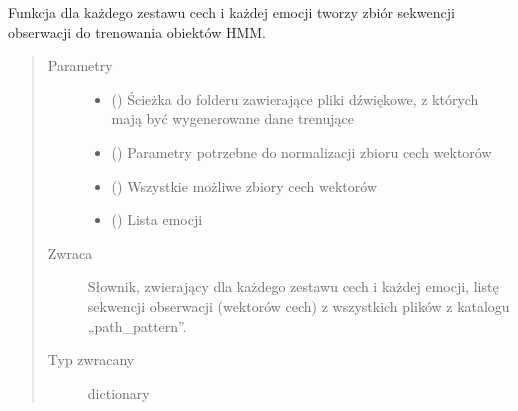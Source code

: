 \documentclass[letterpaper,10pt,polish]{sphinxmanual}
\begin{document}
\begin{fulllineitems}
\label{\detokenize{hmm_main:hmm_main.hmm_get_train_set}}
Funkcja dla każdego zestawu cech i każdej emocji tworzy zbiór sekwencji obserwacji do trenowania obiektów HMM.
\begin{quote}\begin{description}
\item[{Parametry}] \leavevmode\begin{itemize}
\item {} 
 () \textendash{} Ścieżka do folderu zawierające pliki dźwiękowe, z których mają być wygenerowane dane trenujące

\item {} 
 () \textendash{} Parametry potrzebne do normalizacji zbioru cech wektorów

\item {} 
 () \textendash{} Wszystkie możliwe zbiory cech wektorów

\item {} 
 () \textendash{} Lista emocji

\end{itemize}

\item[{Zwraca}] \leavevmode
Słownik, zwierający dla każdego zestawu cech i każdej emocji, listę sekwencji obserwacji (wektorów cech) z
wszystkich plików z katalogu „path\_pattern”.

\item[{Typ zwracany}] \leavevmode
dictionary

\end{description}\end{quote}

\end{fulllineitems}

\end{document}
